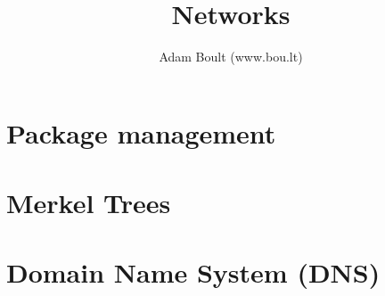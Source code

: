 \documentclass[oneside]{book}
\begin{document}
\author{Adam Boult (www.bou.lt)}
\title{Networks}
\maketitle

\setcounter{tocdepth}{0}
\tableofcontents



\part{Package management}









%

\part{Merkel Trees}


\part{Domain Name System (DNS)}
\end{document}
